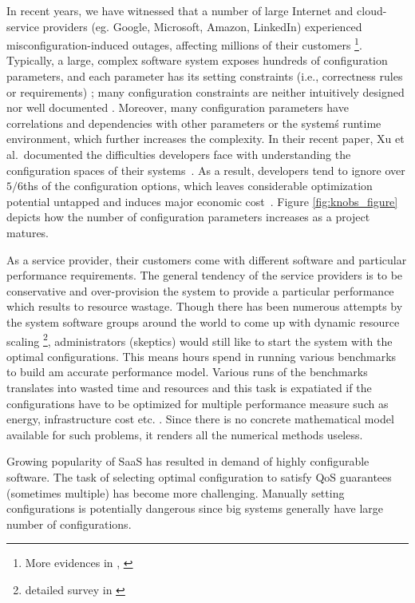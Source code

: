 \documentclass{newsig}
\begin{document}
 In recent years, we have witnessed that a number of large Internet and cloud-service providers (eg. Google, Microsoft, Amazon, LinkedIn) experienced misconfiguration-induced outages, affecting millions of their customers \cite{thomasthanks, brodkin2012,miller2012, liang2013 }\footnote{More evidences in \cite{barroso2013datacenter}, \cite{rabkin2013hadoop} }.  Typically, a large, complex software system exposes hundreds of configuration parameters, and each parameter has its setting constraints (i.e., correctness rules or requirements) \cite{kiciman2004discovering, nadi2014mining}; many configuration constraints are neither intuitively designed nor well documented \cite{rabkin2011static, xu2013not}.  Moreover, many configuration parameters have correlations and dependencies with other parameters or the system\'s runtime environment, which further increases the complexity.  In their recent paper, Xu et al.\ documented the  difficulties developers face
with understanding  the configuration spaces of their systems~\cite{xu2015hey}. As a result, developers tend to ignore over $5/6$ths of the configuration options, which leaves considerable optimization potential untapped and induces major economic cost~\cite{xu2015hey}. Figure \ref{fig:knobs_figure} depicts how the number of configuration parameters increases
as a project matures. 



As a service provider, their customers come with different software and particular performance requirements. The general tendency of the service providers is to be conservative and over-provision the system to provide a particular performance which results to resource wastage. Though there has been numerous attempts by the system software groups around the world to come up with dynamic resource scaling \footnote{detailed survey in \cite{naskos2016cloud}}, administrators (skeptics) would still like to start the system with the optimal configurations. This means hours spend in running various benchmarks to build am accurate performance model. Various runs of the benchmarks translates into wasted time and resources and this task is expatiated if the configurations have to be optimized for multiple performance measure such as energy, infrastructure cost etc. \cite{neha2016}. Since there is no concrete mathematical model available for such problems, it renders all the numerical methods useless.
 
\begin{myshadowbox}
    Growing popularity of SaaS has resulted in demand of highly configurable software. The task of selecting optimal configuration to satisfy QoS guarantees (sometimes multiple) has become more challenging. Manually setting configurations is potentially dangerous since big systems generally have large number of configurations.
\end{myshadowbox}
\end{document}
